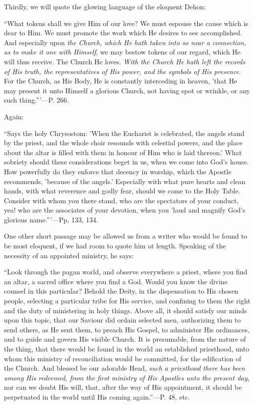 Thirdly, we will quote the glowing language of
the eloquent Dehon:

``What
tokens shall we give Him of our love? We must espouse the cause which
is dear to Him. We must promote the work which He desires to see
accomplished. And especially upon \emph{the Church, which He hath taken
into so near a connection, as to make it one with Himself}, we may
bestow tokens of our regard, which He will thus receive. The Church He
loves. \emph{With the Church He hath left the records of His truth, the
representatives of His power, and the symbols of His presence}. For
the Church, as His Body, He is constantly interceding in heaven, 'that
He may present it unto Himself
a glorious Church, not having spot or wrinkle, or any such thing.'''—P.
266.

Again:

``Says
the holy Chrysostom: 'When the Eucharist is celebrated, the angels
stand by the priest, and the whole choir resounds with celestial
powers, and the place about the altar is filled with them in honour of
Him who is laid thereon.' What sobriety should these considerations
beget in us, when we come into God's house. How powerfully do they
enforce that decency in worship, which the Apostle recommends,
'because of the angels.' Especially with what pure hearts and clean
hands, with what reverence and godly fear, should we come to the Holy
Table. Consider with whom you there stand, who are the spectators of
your conduct, yea! who are the associates of your devotion, when you
'laud and magnify God's glorious name.'''—Pp. 133, 134.

One other short passage may be allowed us from a
writer who would be found to be most eloquent, if we had room to quote
him at length. Speaking of the necessity of an appointed ministry, he
says:

``Look through
the pagan world, and observe everywhere a priest, where you find an
altar, a sacred office where you find a God. Would you know the divine
counsel in this particular? Behold the Deity, in the dispensation to
His chosen people, selecting a particular tribe for His service, and
confining to them the right and the duty of ministering in holy
things. Above all, it should satisfy our minds upon this topic, that
our Saviour did ordain selected men, authorizing them to send others,
as He sent them, to preach His Gospel, to administer His ordinances,
and to guide and govern His visible Church. It is presumable, from the
nature of the thing, that there would be found in the world an
established priesthood, unto whom this ministry of reconciliation
would be committed, for the edification of the Church. And blessed be
our adorable Head, \emph{such a priesthood there has been among His
redeemed, from the first ministry of His Apostles unto the present day},
nor can we doubt His will, that, after the way of His appointment, it
should be perpetuated in the world until His coming again.''—P. 48,
etc.

